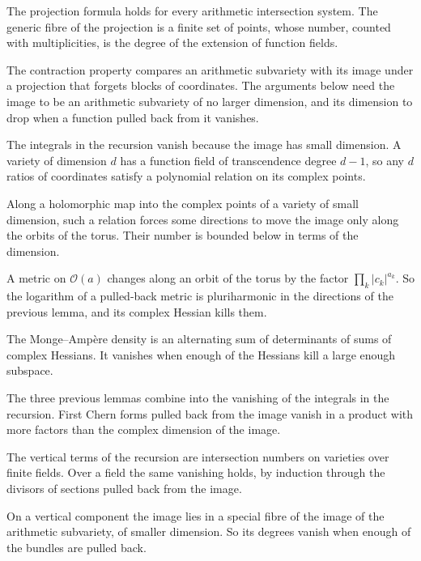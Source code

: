 The projection formula holds for every arithmetic intersection system. The generic fibre of the projection is a
finite set of points, whose number, counted with multiplicities, is the degree of the extension of function fields.

The contraction property compares an arithmetic subvariety with its image under a projection that forgets blocks of
coordinates. The arguments below need the image to be an arithmetic subvariety of no larger dimension, and its
dimension to drop when a function pulled back from it vanishes.

The integrals in the recursion vanish because the image has small dimension. A variety of dimension $d$ has a function
field of transcendence degree $d-1$, so any $d$ ratios of coordinates satisfy a polynomial relation on its complex
points.

Along a holomorphic map into the complex points of a variety of small dimension, such a relation forces some
directions to move the image only along the orbits of the torus. Their number is bounded below in terms of the
dimension.

A metric on $\mathcal O(a)$ changes along an orbit of the torus by the factor $\prod_k|c_k|^{a_k}$. So the logarithm of
a pulled-back metric is pluriharmonic in the directions of the previous lemma, and its complex Hessian kills them.

The Monge--Amp\`ere density is an alternating sum of determinants of sums of complex Hessians. It vanishes when enough
of the Hessians kill a large enough subspace.

The three previous lemmas combine into the vanishing of the integrals in the recursion. First Chern forms pulled back
from the image vanish in a product with more factors than the complex dimension of the image.

The vertical terms of the recursion are intersection numbers on varieties over finite fields. Over a field the same
vanishing holds, by induction through the divisors of sections pulled back from the image.

On a vertical component the image lies in a special fibre of the image of the arithmetic subvariety, of smaller
dimension. So its degrees vanish when enough of the bundles are pulled back.

